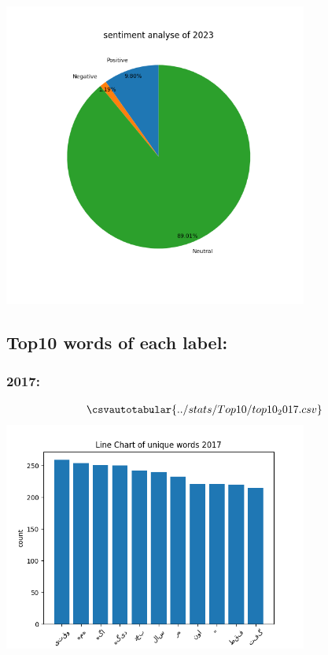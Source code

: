 \documentclass[a4paper]{article}
\begin{document}
\includegraphics[width=0.75\textwidth]{../stats/Counts/sentimentchart2023.png}\\
\subsection{Top10 words of each label:}
\subsubsection{2017:}
\begin{align*}
	\csvautotabular{../stats/Top10/top10_2017.csv}
\end{align*} 
\includegraphics[width=0.75\textwidth]{../stats/Top10/top10chart2017.png}
\end{document}
